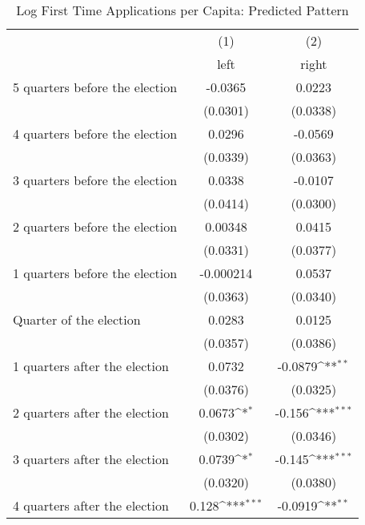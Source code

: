\begin{table}[htbp]\centering
\def\sym#1{\ifmmode^{#1}\else\(^{#1}\)\fi}
\caption{Log First Time Applications per Capita: Predicted Pattern}
\begin{tabular}{l*{2}{c}}
\hline\hline
                    &\multicolumn{1}{c}{(1)}&\multicolumn{1}{c}{(2)}\\
                    &\multicolumn{1}{c}{left}&\multicolumn{1}{c}{right}\\
\hline
 5 quarters before the election&     -0.0365         &      0.0223         \\
                    &    (0.0301)         &    (0.0338)         \\
[1em]
 4 quarters before the election&      0.0296         &     -0.0569         \\
                    &    (0.0339)         &    (0.0363)         \\
[1em]
 3 quarters before the election&      0.0338         &     -0.0107         \\
                    &    (0.0414)         &    (0.0300)         \\
[1em]
 2 quarters before the election&     0.00348         &      0.0415         \\
                    &    (0.0331)         &    (0.0377)         \\
[1em]
 1 quarters before the election&   -0.000214         &      0.0537         \\
                    &    (0.0363)         &    (0.0340)         \\
[1em]
Quarter of the election&      0.0283         &      0.0125         \\
                    &    (0.0357)         &    (0.0386)         \\
[1em]
 1 quarters after the election&      0.0732         &     -0.0879\sym{**} \\
                    &    (0.0376)         &    (0.0325)         \\
[1em]
 2 quarters after the election&      0.0673\sym{*}  &      -0.156\sym{***}\\
                    &    (0.0302)         &    (0.0346)         \\
[1em]
 3 quarters after the election&      0.0739\sym{*}  &      -0.145\sym{***}\\
                    &    (0.0320)         &    (0.0380)         \\
[1em]
 4 quarters after the election&       0.128\sym{***}&     -0.0919\sym{**} \\

\end{tabular}
\end{table}
